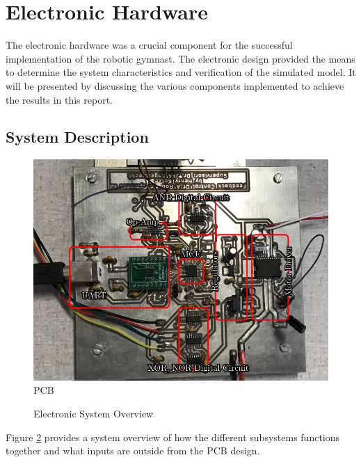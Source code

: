 \section{Electronic Hardware}
\label{sec:electronic_hardware}
The electronic hardware was a crucial component for the successful implementation of the robotic gymnast. The electronic design provided the means to determine the system characteristics and verification of the simulated model. It will be presented by discussing the various components implemented to achieve the results in this report.

\subsection{System Description}

\begin{figure}[h]
	\centering
	\includegraphics{./figs/PCB_layout/PCB.pdf}
	\caption{PCB}
	\label{fig:pcb}
\end{figure}


\begin{figure}[h]
	\centering
	
	\caption{Electronic System Overview}
	\label{fig:electronicSystemOverview}
\end{figure}



Figure \ref{fig:electronicSystemOverview} provides a system overview of how the different subsystems functions together and what inputs are outside from the PCB design.\\

